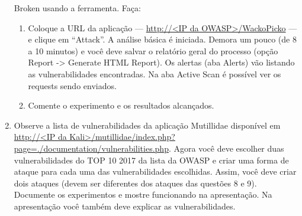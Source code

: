 \documentclass{article}
\begin{document}
\begin{superframe}
\begin{enumerate}
                Broken usando a ferramenta. Faça:
                \begin{enumerate}
                    \item Coloque a URL da aplicação --- \url{http://<IP da
                        OWASP>/WackoPicko} --- e clique em ``Attack''. A análise
                        básica é iniciada. Demora um pouco (de 8 a 10 minutos) e
                        você deve salvar o relatório geral do processo (opção
                        Report -> Generate HTML Report). Os alertas (aba Alerts)
                        vão listando as vulnerabilidades encontradas. Na aba Active
                        Scan é possível ver os requests sendo enviados.
                    \item Comente o experimento e os resultados alcançados.
                \end{enumerate}
            \item Observe a lista de vulnerabilidades da aplicação Mutillidae
                disponível em \url{http://<IP da
                Kali>/mutillidae/index.php?page=./documentation/vulnerabilities.php}.
                Agora você deve escolher duas vulnerabilidades do TOP 10 2017 da
                lista da OWASP e criar uma forma de ataque para cada uma das
                vulnerabilidades escolhidas. Assim, você deve criar dois ataques
                (devem ser diferentes dos ataques das questões 8 e 9). Documente os
                experimentos e mostre funcionando na apresentação. Na apresentação
                você também deve explicar as vulnerabilidades.
        \end{enumerate}
    \end{superframe}
\end{document}
